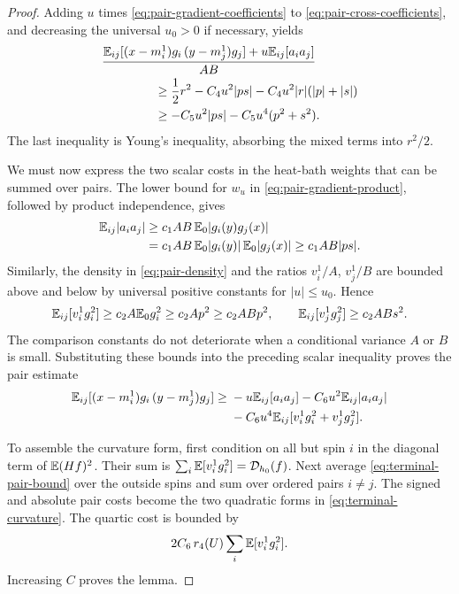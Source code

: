 \begin{proof}
Adding $u$ times \eqref{eq:pair-gradient-coefficients} to
\eqref{eq:pair-cross-coefficients}, and decreasing the universal $u_0>0$
if necessary, yields
\begin{align*}
 &\frac{\E_{ij}[(x-m_i^1)g_i\,(y-m_j^1)g_j]
                    +u\E_{ij}[a_i a_j]}{AB}\\
 &\hspace{15mm}\ge
       \frac12r^2-C_4u^2|ps|
                       -C_4u^2|r|(|p|+|s|)\\
 &\hspace{15mm}\ge -C_5u^2|ps|-C_5u^4(p^2+s^2).
\end{align*}
The last inequality is Young's inequality, absorbing the mixed terms
into $r^2/2$.

We must now express the two scalar costs in the heat-bath weights that
can be summed over pairs. The lower bound for $w_u$ in
\eqref{eq:pair-gradient-product}, followed by product independence,
gives
\begin{align*}
 \mathbb E_{ij}|a_i a_j|
 &\ge c_1AB\,\mathbb E_0|g_i(y)g_j(x)|\\
 &=c_1AB\,\mathbb E_0|g_i(y)|\,\mathbb E_0|g_j(x)|
 \ge c_1AB|ps|.
\end{align*}
Similarly, the density in \eqref{eq:pair-density} and the ratios
$v_i^1/A$, $v_j^1/B$ are bounded above and below by universal positive
constants for $|u|\le u_0$.  Hence
\[
 \mathbb E_{ij}[v_i^1g_i^2]\ge c_2A\mathbb E_0g_i^2
                       \ge c_2Ap^2\ge c_2ABp^2,
 \qquad
 \mathbb E_{ij}[v_j^1g_j^2]\ge c_2ABs^2.
\]
The comparison constants do not deteriorate when a conditional variance
$A$ or $B$ is small. Substituting these bounds into the preceding scalar
inequality proves the pair estimate
\begin{align}
 \mathbb E_{ij}[(x-m_i^1)g_i\,(y-m_j^1)g_j]
 \ge{}&-u\mathbb E_{ij}[a_i a_j]-C_6u^2\mathbb E_{ij}|a_i a_j|\notag\\
 &-C_6u^4\mathbb E_{ij}[v_i^1g_i^2+v_j^1g_j^2].
 \label{eq:terminal-pair-bound}
\end{align}

To assemble the curvature form, first condition on all but spin $i$ in
the diagonal term of $\mathbb E(Hf)^2$. Their sum is
$\sum_i\mathbb E[v_i^1g_i^2]=\mathcal D_{h_0}(f)$. Next average
\eqref{eq:terminal-pair-bound} over the outside spins and sum over
ordered pairs $i\ne j$. The signed and absolute pair costs become the
two quadratic forms in \eqref{eq:terminal-curvature}. The quartic cost
is bounded by
\[
 2C_6\,r_4(U)\sum_i\mathbb E[v_i^1g_i^2].
\]
Increasing $C$ proves the lemma.
\end{proof}

